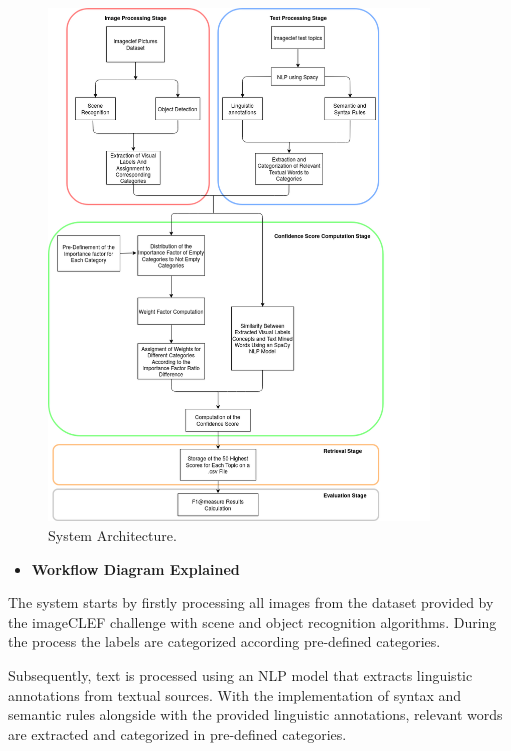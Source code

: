 \begin{figure}[H]
   
    \captionsetup{justification=centering}
    \hspace{+1cm} \includegraphics[width = 0.9\textwidth]{Sections/6textprocessing/images/diagram.png}
    \caption{System Architecture.}
    \label{fig:testtopic}
  \end{figure}

\newpage

\begin{itemize}
  \item \textbf{Workflow Diagram Explained}
\end{itemize}

The system starts by firstly processing all images from the dataset provided by the imageCLEF challenge with scene and object recognition algorithms. During the process the labels are categorized according pre-defined categories.

Subsequently, text is processed using an NLP model that extracts linguistic annotations from textual sources.  With the implementation of syntax and semantic rules alongside with the provided linguistic annotations, relevant words are extracted and categorized in pre-defined categories. 

